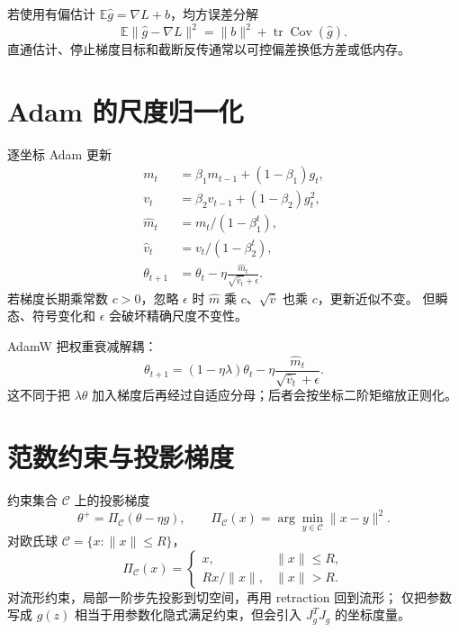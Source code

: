 \documentclass[11pt]{article}
\numberwithin{equation}{section}
\newcommand{\E}{\mathbb{E}}
\newcommand{\1}{\mathbf{1}}
\newcommand{\tr}{\operatorname{tr}}
\newcommand{\Cov}{\operatorname{Cov}}
\begin{document}
若使用有偏估计 $\E\widehat g=\nabla L+b$，均方误差分解
\begin{equation}
 \E\|\widehat g-\nabla L\|^2
 =\|b\|^2+\tr\Cov(\widehat g).
\end{equation}
直通估计、停止梯度目标和截断反传通常以可控偏差换低方差或低内存。

\section{Adam 的尺度归一化}

逐坐标 Adam 更新
\begin{align}
 m_t&=\beta_1m_{t-1}+(1-\beta_1)g_t,\\
 v_t&=\beta_2v_{t-1}+(1-\beta_2)g_t^2,\\
 \widehat m_t&=m_t/(1-\beta_1^t),\\
 \widehat v_t&=v_t/(1-\beta_2^t),\\
 \theta_{t+1}&=\theta_t-\eta
 \frac{\widehat m_t}{\sqrt{\widehat v_t}+\epsilon}.
\end{align}
若梯度长期乘常数 $c>0$，忽略 $\epsilon$ 时
$\widehat m$ 乘 $c$、$\sqrt{\widehat v}$ 也乘 $c$，更新近似不变。
但瞬态、符号变化和 $\epsilon$ 会破坏精确尺度不变性。

AdamW 把权重衰减解耦：
\begin{equation}
 \theta_{t+1}=(1-\eta\lambda)\theta_t
 -\eta\frac{\widehat m_t}{\sqrt{\widehat v_t}+\epsilon}.
\end{equation}
这不同于把 $\lambda\theta$ 加入梯度后再经过自适应分母；后者会按坐标二阶矩缩放正则化。

\section{范数约束与投影梯度}

约束集合 $\mathcal C$ 上的投影梯度
\begin{equation}
 \theta^+=\Pi_{\mathcal C}(\theta-\eta g),
 \qquad
 \Pi_{\mathcal C}(x)=\arg\min_{y\in\mathcal C}\|x-y\|^2.
\end{equation}
对欧氏球 $\mathcal C=\{x:\|x\|\le R\}$，
\begin{equation}
 \Pi_{\mathcal C}(x)=
 \begin{cases}
 x,&\|x\|\le R,\\
 Rx/\|x\|,&\|x\|>R.
 \end{cases}
\end{equation}
对流形约束，局部一阶步先投影到切空间，再用 retraction 回到流形；
仅把参数写成 $g(z)$ 相当于用参数化隐式满足约束，但会引入 $J_g^TJ_g$ 的坐标度量。
\end{document}
